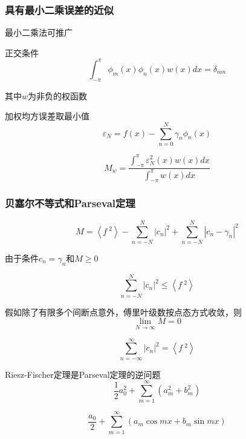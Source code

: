 \documentclass[10pt]{beamer}
\begin{document}
  \begin{frame}[allowframebreaks]
  \frametitle{具有最小二乘误差的近似}
  
  最小二乘法可推广
  
  正交条件
  \begin{equation}
  \int_{-\pi}^{\pi} \phi_{m}(x) \phi_{n}(x) w(x) d x=\delta_{m n}
  \end{equation}
  
  其中$w$为非负的权函数
  
  加权均方误差取最小值
  \begin{equation}
  \varepsilon_{N}=f(x)-\sum_{n=0}^{N} \gamma_{n} \phi_{n}(x)
  \end{equation}
  
  \begin{equation}
  M_{w}=\frac{\int_{-\pi}^{\pi} \varepsilon_{N}^{2}(x) w(x) d x}{\int_{-\pi}^{\pi} w(x) d x}
  \end{equation}
  \end{frame}
  
  \begin{frame}[allowframebreaks]
  \frametitle{贝塞尔不等式和Parseval定理}
  
  \begin{equation}
  M=\left\langle f\ ^{2}\right\rangle-\sum_{n=-N}^{N}\left|c_{n}\right|^{2}+\sum_{n=-N}^{N}\left|c_{n}-\gamma_{n}\right|^{2}
  \end{equation}
  
  由于条件$c_{n}=\gamma_{n}$和$M \geq 0$
  
  \begin{equation}
  \sum_{n=-N}^{N}\left|c_{n}\right|^{2} \leq\left\langle f\ ^{2}\right\rangle
  \end{equation}
  
  假如除了有限多个间断点意外，傅里叶级数按点态方式收敛，则
  \begin{equation}
  \lim _{N \rightarrow \infty} M=0
  \end{equation}
  
  \begin{equation}
  \sum_{n=-\infty}^{\infty}\left|c_{n}\right|^{2}=\left\langle f\ ^{2}\right\rangle
  \end{equation}
  
  Riesz-Fischer定理是Parseval定理的逆问题
  \begin{equation}
  \frac{1}{2} a_{0}^{2}+\sum_{m=1}^{\infty}\left(a_{m}^{2}+b_{m}^{2}\right)
  \end{equation}
  
  \begin{equation}
  \frac{a_{0}}{2}+\sum_{m=1}^{\infty}\left(a_{m} \cos m x+b_{m} \sin m x\right)
  \end{equation}
  
  \end{frame}
  
\end{document}
